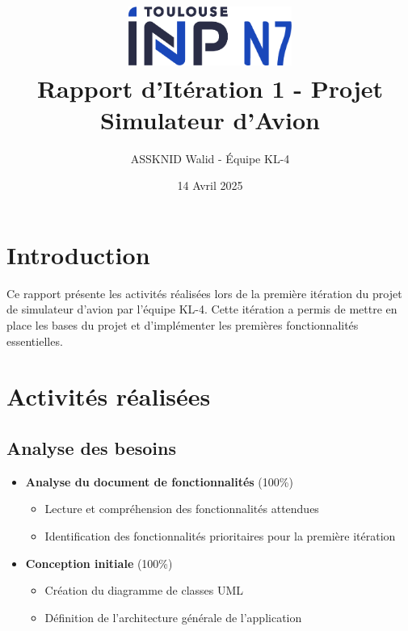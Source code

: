 \documentclass[12pt,a4paper]{article}
\title{
    \includegraphics[width=0.4\textwidth]{n7.png}\\[1cm]
    \textbf{Rapport d'Itération 1 - Projet Simulateur d'Avion}
}
\author{ASSKNID Walid - Équipe KL-4}
\date{14 Avril 2025}
\begin{document}
\maketitle
\thispagestyle{empty}

\section{Introduction}
Ce rapport présente les activités réalisées lors de la première itération du projet de simulateur d'avion par l'équipe KL-4. Cette itération a permis de mettre en place les bases du projet et d'implémenter les premières fonctionnalités essentielles.

\section{Activités réalisées}

\subsection{Analyse des besoins}
\begin{itemize}
    \item \textbf{Analyse du document de fonctionnalités} (100\%)
    \begin{itemize}
        \item Lecture et compréhension des fonctionnalités attendues
        \item Identification des fonctionnalités prioritaires pour la première itération
    \end{itemize}
    
    \item \textbf{Conception initiale} (100\%)
    \begin{itemize}
        \item Création du diagramme de classes UML
        \item Définition de l'architecture générale de l'application
    \end{itemize}
\end{itemize}
\end{document}
